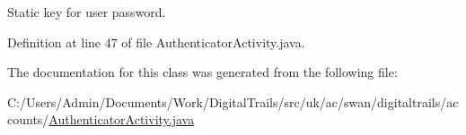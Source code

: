 Static key for user password. 



Definition at line 47 of file Authenticator\+Activity.\+java.



The documentation for this class was generated from the following file\+:\begin{DoxyCompactItemize}
\item 
C\+:/\+Users/\+Admin/\+Documents/\+Work/\+Digital\+Trails/src/uk/ac/swan/digitaltrails/accounts/\hyperlink{_authenticator_activity_8java}{Authenticator\+Activity.\+java}\end{DoxyCompactItemize}
